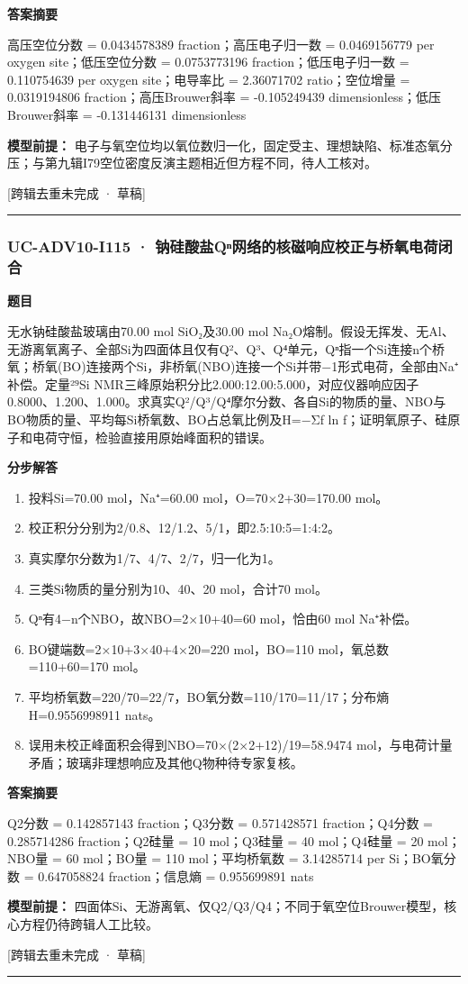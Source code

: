 \documentclass[UTF8,11pt,a4paper]{ctexart}
\begin{document}
\noindent\textbf{答案摘要}\par
高压空位分数 = 0.0434578389 fraction；高压电子归一数 = 0.0469156779 per oxygen site；低压空位分数 = 0.0753773196 fraction；低压电子归一数 = 0.110754639 per oxygen site；电导率比 = 2.36071702 ratio；空位增量 = 0.0319194806 fraction；高压Brouwer斜率 = -0.105249439 dimensionless；低压Brouwer斜率 = -0.131446131 dimensionless\par
\noindent\textbf{模型前提：}
电子与氧空位均以氧位数归一化，固定受主、理想缺陷、标准态氧分压；与第九辑I79空位密度反演主题相近但方程不同，待人工核对。\par
\noindent\textcolor{red!65!black}{[跨辑去重未完成 · 草稿]} \par
\medskip\hrule\medskip
{}
\subsubsection*{UC-ADV10-I115 · 钠硅酸盐Qⁿ网络的核磁响应校正与桥氧电荷闭合}
\noindent\textbf{题目}\par
无水钠硅酸盐玻璃由70.00 mol SiO₂及30.00 mol Na₂O熔制。假设无挥发、无Al、无游离氧离子、全部Si为四面体且仅有Q²、Q³、Q⁴单元，Qⁿ指一个Si连接n个桥氧；桥氧(BO)连接两个Si，非桥氧(NBO)连接一个Si并带−1形式电荷，全部由Na⁺补偿。定量²⁹Si NMR三峰原始积分比2.000:12.00:5.000，对应仪器响应因子0.8000、1.200、1.000。求真实Q²/Q³/Q⁴摩尔分数、各自Si的物质的量、NBO与BO物质的量、平均每Si桥氧数、BO占总氧比例及H=−Σf ln f；证明氧原子、硅原子和电荷守恒，检验直接用原始峰面积的错误。\par
\medskip\noindent\textbf{分步解答}
\begin{enumerate}
\item 投料Si=70.00 mol，Na⁺=60.00 mol，O=70×2+30=170.00 mol。
\item 校正积分分别为2/0.8、12/1.2、5/1，即2.5:10:5=1:4:2。
\item 真实摩尔分数为1/7、4/7、2/7，归一化为1。
\item 三类Si物质的量分别为10、40、20 mol，合计70 mol。
\item Qⁿ有4−n个NBO，故NBO=2×10+40=60 mol，恰由60 mol Na⁺补偿。
\item BO键端数=2×10+3×40+4×20=220 mol，BO=110 mol，氧总数=110+60=170 mol。
\item 平均桥氧数=220/70=22/7，BO氧分数=110/170=11/17；分布熵H=0.9556998911 nats。
\item 误用未校正峰面积会得到NBO=70×(2×2+12)/19=58.9474 mol，与电荷计量矛盾；玻璃非理想响应及其他Q物种待专家复核。
\end{enumerate}
\noindent\textbf{答案摘要}\par
Q2分数 = 0.142857143 fraction；Q3分数 = 0.571428571 fraction；Q4分数 = 0.285714286 fraction；Q2硅量 = 10 mol；Q3硅量 = 40 mol；Q4硅量 = 20 mol；NBO量 = 60 mol；BO量 = 110 mol；平均桥氧数 = 3.14285714 per Si；BO氧分数 = 0.647058824 fraction；信息熵 = 0.955699891 nats\par
\noindent\textbf{模型前提：}
四面体Si、无游离氧、仅Q2/Q3/Q4；不同于氧空位Brouwer模型，核心方程仍待跨辑人工比较。\par
\noindent\textcolor{red!65!black}{[跨辑去重未完成 · 草稿]} \par
\medskip\hrule\medskip
{}
\end{document}
